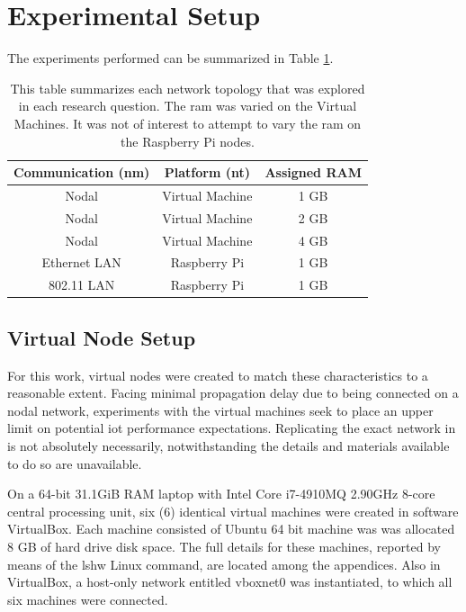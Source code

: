 \section{Experimental Setup}

The experiments performed can be summarized in Table \ref{table:topologies}.
\begin{table}
\begin{center}
 \begin{tabular}{||c c c||} 
 \hline
 Communication (nm) & Platform (nt) & Assigned RAM \\ [0.5ex] 
 \hline\hline
 Nodal & Virtual Machine & 1 GB \\ 
 \hline
 Nodal & Virtual Machine & 2 GB \\
 \hline
 Nodal & Virtual Machine & 4 GB \\
 \hline
 Ethernet LAN & Raspberry Pi & 1 GB \\
 \hline
 802.11 LAN & Raspberry Pi & 1 GB \\
 \hline
\end{tabular}
\end{center}
\caption{This table summarizes each network topology that was explored in each research question.  The \gls{ram} was varied on the Virtual Machines.  It was not of interest to attempt to vary the \gls{ram} on the Raspberry Pi nodes.}
\label{table:topologies}
\end{table}



\subsection{Virtual Node Setup}

For this work, virtual nodes were created to match these characteristics to a reasonable extent.  Facing minimal propagation delay due to being connected on a nodal network, experiments with the virtual machines seek to place an upper limit on potential \gls{iot} performance expectations. Replicating the exact network in \cite{Abramova2014} is not absolutely necessarily, notwithstanding the details and materials available to do so are unavailable.

On a 64-bit 31.1GiB RAM laptop with Intel Core i7-4910MQ 2.90GHz 8-core central processing unit, six (6) identical virtual machines were created in software VirtualBox.  Each machine consisted of Ubuntu 64 bit machine was was allocated 8 GB of hard drive disk space.  The full details for these machines, reported by means of the lshw Linux command, are located among the appendices.  Also in VirtualBox, a host-only network entitled vboxnet0 was instantiated, to which all six machines were connected.

